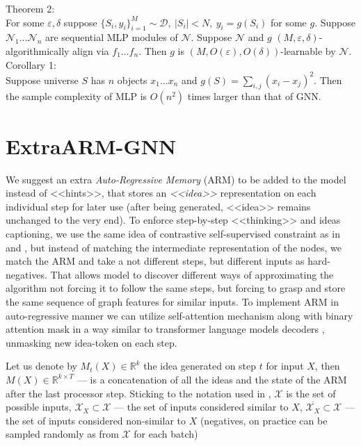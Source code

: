 \documentclass{article}
\begin{document}
    Theorem 2:\\
        For some $\varepsilon, \delta$ suppose $\{S_i, y_i\}_{i=1}^M\sim \mathcal{D}, ~|S_i|< N,~ y_i = g(S_i)$ for some $g$. 
        Suppose $\mathcal{N}_1\dots \mathcal{N}_n$ are sequential MLP modules of $\mathcal{N}$. Suppose $\mathcal{N}$ and $g$ $(M, \varepsilon, \delta)$-algorithmically align via $f_1\dots f_n$.	
        Then $g$ is $(M, O(\varepsilon), O(\delta))$-learnable by $\mathcal{N}$.\\
    
    Corollary 1:\\
        Suppose universe $S$ has $n$ objects $x_1\dots x_n$ and $g(S) = \sum_{i,j} (x_i - x_j)^2$. Then the sample complexity 
        of MLP is $O(n^2)$ times larger than that of GNN.
    

\section{ExtraARM-GNN}
We suggest an extra \textit{Auto-Regressive Memory} (ARM) to be added to the model instead of <<hints>>, that stores an \textit{<<idea>>} representation on each 
individual step for later use (after being generated, <<idea>> remains unchanged to the very end). To enforce step-by-step <<thinking>> and ideas captioning, we 
use the same idea of contrastive self-supervised constraint as in \cite{rodionov2024neural} and \cite{bevilacqua2023neural}, but instead of matching the 
intermediate representation of the nodes, we match the ARM and take a not different steps, but different inputs as hard-negatives. That allows model 
to discover different ways of approximating the algorithm not forcing it to follow the same steps, but forcing to grasp and store the same sequence 
of graph features for similar inputs. To implement ARM in auto-regressive manner we can utilize self-attention mechanism along with binary 
attention mask in a way similar to transformer language models decoders \cite{vaswani2023attentionneed}, unmasking new idea-token on each step.

Let us denote by $M_t(X) \in \mathbb{R}^k$ the idea generated on step $t$ for input $X$, then $M(X)\in \mathbb{R}^{k\times T}$ --- is a concatenation
 of all the ideas and the state of the ARM after the last processor step. Sticking to the notation used in \cite{rodionov2024neural}, 
 $\mathcal{X}$ is the set of possible inputs, $\mathcal{X}_X\subset \mathcal{X}$ --- the set of inputs considered similar to $X$,
 $\overline{\mathcal{X}_X}\subset \mathcal{X}$ --- the set of inputs considered non-similar to $X$ 
 (negatives, on practice can be sampled randomly as from $\mathcal{X}$ for each batch)
\end{document}
